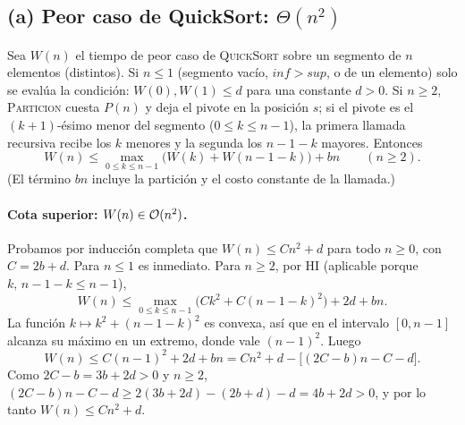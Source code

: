 \subsection*{(a) Peor caso de QuickSort: $\Theta(n^2)$}

Sea $W(n)$ el tiempo de peor caso de \textsc{QuickSort} sobre un segmento de $n$
elementos (distintos). Si $n\le 1$ (segmento vacío, $\mathit{inf}>\mathit{sup}$, o de un
elemento) solo se evalúa la condición: $W(0),W(1)\le d$ para una constante $d>0$. Si
$n\ge2$, \textsc{Particion} cuesta $P(n)$ y deja el pivote en la posición $s$; si el
pivote es el $(k+1)$-ésimo menor del segmento ($0\le k\le n-1$), la primera llamada
recursiva recibe los $k$ menores y la segunda los $n-1-k$ mayores. Entonces
\[
W(n)\le \max_{0\le k\le n-1}\bigl(W(k)+W(n-1-k)\bigr)+bn\qquad(n\ge 2).
\]
(El término $bn$ incluye la partición y el costo constante de la llamada.)

\paragraph{Cota superior: $W(n)\in\mathcal{O}(n^2)$.} Probamos por inducción completa que
$W(n)\le Cn^2+d$ para todo $n\ge0$, con $C=2b+d$. Para $n\le1$ es inmediato. Para $n\ge2$,
por HI (aplicable porque $k,\,n-1-k\le n-1$),
\[
W(n)\le \max_{0\le k\le n-1}\bigl(C k^2+C(n-1-k)^2\bigr)+2d+bn.
\]
La función $k\mapsto k^2+(n-1-k)^2$ es convexa, así que en el intervalo $[0,n-1]$ alcanza
su máximo en un extremo, donde vale $(n-1)^2$. Luego
\[
W(n)\le C(n-1)^2+2d+bn = Cn^2+d-\bigl[(2C-b)n-C-d\bigr].
\]
Como $2C-b=3b+2d>0$ y $n\ge2$, $(2C-b)n-C-d\ge 2(3b+2d)-(2b+d)-d=4b+2d>0$, y por lo tanto
$W(n)\le Cn^2+d$.

